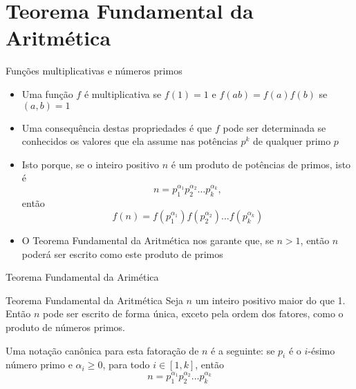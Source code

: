 \section{Teorema Fundamental da Aritmética}

\begin{frame}[fragile]{Funções multiplicativas e números primos}

    \begin{itemize}
        \item Uma função $f$ é multiplicativa se $f(1) = 1$ e $f(ab) = f(a)f(b)$ se $(a, b) = 1$

        \item Uma consequência destas propriedades é que $f$ pode ser determinada se conhecidos
            os valores que ela assume nas potências $p^k$ de qualquer primo $p$

        \item Isto porque, se o inteiro positivo $n$ é um produto de potências de primos, isto é
        $$
            n = p_1^{\alpha_1}p_2^{\alpha_2}\ldots p_k^{\alpha_k},
        $$
        então
        $$
            f(n) = f(p_1^{\alpha_1})f(p_2^{\alpha_2})\ldots f(p_k^{\alpha_k})
        $$

        \item O Teorema Fundamental da Aritmética nos garante que, se $n > 1$, então $n$ poderá
            ser escrito como este produto de primos
    \end{itemize}

\end{frame}

\begin{frame}[fragile]{Teorema Fundamental da Arimética}

    \begin{block}{Teorema Fundamental da Aritmética}
        Seja $n$ um inteiro positivo maior do que 1. Então $n$ pode ser escrito de forma única,  
        exceto pela ordem dos fatores, como o produto de números primos.

        Uma notação canônica para esta fatoração de $n$ é a seguinte: se $p_i$ é o $i$-ésimo número 
        primo e $\alpha_i \geq 0$, para todo $i\in [1, k]$, então
        $$
            n = p_1^{\alpha_1}p_2^{\alpha_2}\ldots p_k^{\alpha_k}
        $$
    \end{block}

\end{frame}

